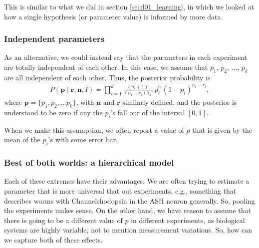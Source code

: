 This is similar to what we did in section \ref{sec:l01_learning}, in
which we looked at how a single hypothesis (or parameter value) is
informed by more data.


\subsubsection{Independent parameters}
As an alternative, we could instead say that the parameters in each
experiment are totally independent of each other.  In this case, we
assume that $p_1$, $p_2$, $\ldots$, $p_k$ are all independent of each
other.  Thus, the posterior probability is
\begin{align}
P(\mathbf{p}\mid \mathbf{r},\mathbf{n}, I) = \prod_{i=1}^k
\frac{(n_i+1)!}{(n_i-r_i)!r_i!}\,p_i^{r_i}(1-p_i)^{n_i-r_i},
\end{align}
where $\mathbf{p} = \{p_1, p_2, \ldots p_k\}$, with $\mathbf{n}$ and
$\mathbf{r}$ similarly defined, and the posterior is understood to be
zero if any the $p_i$'s fall our of the interval $[0,1]$.  

When we make this assumption, we often report a value of $p$ that is
given by the mean of the $p_i$'s with some error bar.


\subsubsection{Best of both worlds: a hierarchical model}
Each of these extremes have their advantages.  We are often trying to
estimate a parameter that is more universal that out experiments,
e.g., something that describes worms with Channelrhodopsin in the ASH
neuron generally.  So, pooling the experiments makes sense.  On the
other hand, we have reason to assume that there is going to be a
different value of $p$ in different experiments, as biological systems
are highly variable, not to mention measurement variations.  So, how
can we capture both of these effects.

